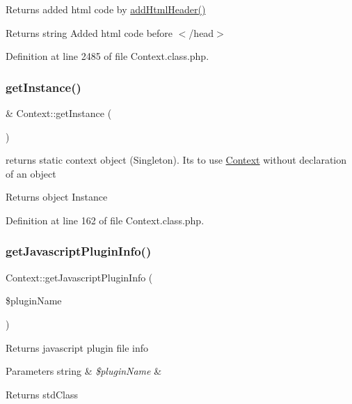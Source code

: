 Returns added html code by \hyperlink{classContext_a26a1aea944ae54bb826500f544a67950}{add\+Html\+Header()}

\begin{DoxyReturn}{Returns}
string Added html code before $<$/head$>$ 
\end{DoxyReturn}


Definition at line 2485 of file Context.\+class.\+php.

\mbox{\label{classContext_a399e419617c7fe9b0c9eaf22c431df69}} 
\subsubsection{\texorpdfstring{get\+Instance()}{getInstance()}}
{\footnotesize\ttfamily \& Context\+::get\+Instance (\begin{DoxyParamCaption}{ }\end{DoxyParamCaption})}

returns static context object (Singleton). It\textquotesingle{}s to use \hyperlink{classContext}{Context} without declaration of an object

\begin{DoxyReturn}{Returns}
object Instance 
\end{DoxyReturn}


Definition at line 162 of file Context.\+class.\+php.

\mbox{\label{classContext_abf616bb3259e090c6e85b3aa1b581b60}} 
\subsubsection{\texorpdfstring{get\+Javascript\+Plugin\+Info()}{getJavascriptPluginInfo()}}
{\footnotesize\ttfamily Context\+::get\+Javascript\+Plugin\+Info (\begin{DoxyParamCaption}\item[{}]{\$plugin\+Name }\end{DoxyParamCaption})}

Returns javascript plugin file info 
\begin{DoxyParams}[1]{Parameters}
string & {\em \$plugin\+Name} & \\
\hline
\end{DoxyParams}
\begin{DoxyReturn}{Returns}
std\+Class 
\end{DoxyReturn}


